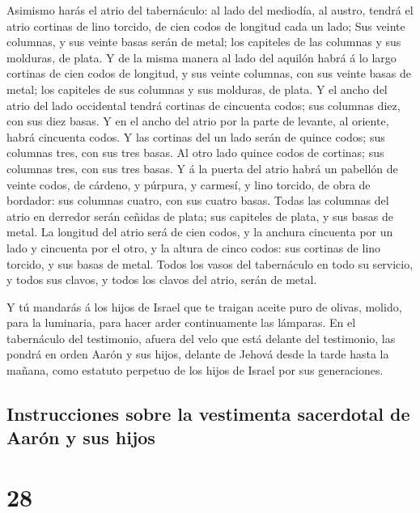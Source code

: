  Asimismo harás el atrio del tabernáculo: al lado del
mediodía, al austro, tendrá el atrio cortinas de lino torcido, de cien
codos de longitud cada un lado;  Sus veinte columnas, y
sus veinte basas serán de metal; los capiteles de las columnas y sus
molduras, de plata.  Y de la misma manera al lado del
aquilón habrá á lo largo cortinas de cien codos de longitud, y sus
veinte columnas, con sus veinte basas de metal; los capiteles de sus
columnas y sus molduras, de plata.  Y el ancho del atrio
del lado occidental tendrá cortinas de cincuenta codos; sus columnas
diez, con sus diez basas.  Y en el ancho del atrio por la
parte de levante, al oriente, habrá cincuenta codos.  Y
las cortinas del un lado serán de quince codos; sus columnas tres, con
sus tres basas.  Al otro lado quince codos de cortinas;
sus columnas tres, con sus tres basas.  Y á la puerta del
atrio habrá un pabellón de veinte codos, de cárdeno, y púrpura, y
carmesí, y lino torcido, de obra de bordador: sus columnas cuatro, con
sus cuatro basas.  Todas las columnas del atrio en
derredor serán ceñidas de plata; sus capiteles de plata, y sus basas de
metal.  La longitud del atrio será de cien codos, y la
anchura cincuenta por un lado y cincuenta por el otro, y la altura de
cinco codos: sus cortinas de lino torcido, y sus basas de metal.
 Todos los vasos del tabernáculo en todo su servicio, y
todos sus clavos, y todos los clavos del atrio, serán de metal.

 Y tú mandarás á los hijos de Israel que te traigan
aceite puro de olivas, molido, para la luminaria, para hacer arder
continuamente las lámparas.  En el tabernáculo del
testimonio, afuera del velo que está delante del testimonio, las pondrá
en orden Aarón y sus hijos, delante de Jehová desde la tarde hasta la
mañana, como estatuto perpetuo de los hijos de Israel por sus
generaciones.

\hypertarget{instrucciones-sobre-la-vestimenta-sacerdotal-de-aaruxf3n-y-sus-hijos}{%
\subsection{Instrucciones sobre la vestimenta sacerdotal de Aarón y sus
hijos}\label{instrucciones-sobre-la-vestimenta-sacerdotal-de-aaruxf3n-y-sus-hijos}}

\hypertarget{section-27}{%
\section{28}\label{section-27}}


